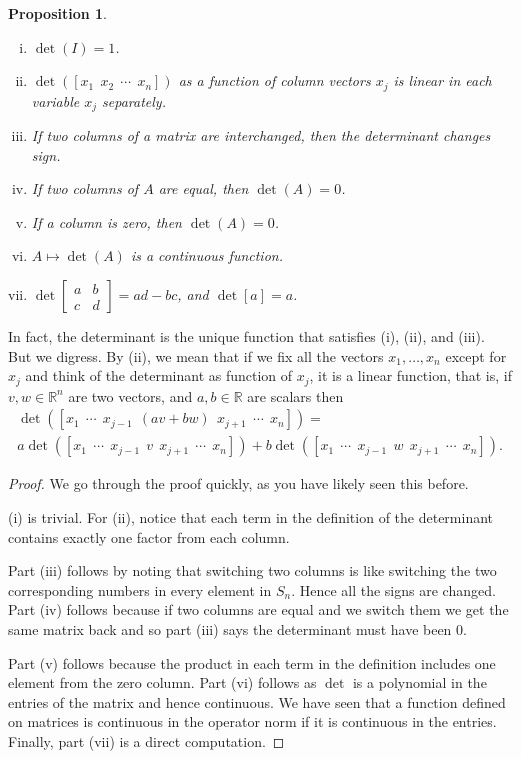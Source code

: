 \documentclass[12pt]{book}
\newcommand{\R}{{\mathbb{R}}}
\theoremstyle{plain}
\newtheorem{prop}[thm]{Proposition}
\theoremstyle{remark}
\theoremstyle{definition}
\theoremstyle{exercise}
\theoremstyle{example}
\begin{document}
\begin{prop}
{\ }
\begin{enumerate}[(i)]
\item $\det(I) = 1$.
\item $\det([x_1 ~~ x_2 ~~ \cdots ~~ x_n ])$ as a function of column vectors $x_j$
is linear in each variable $x_j$ separately.
\item If two columns of a matrix are interchanged, then the determinant changes
sign.
\item If two columns of $A$ are equal, then $\det(A) = 0$.
\item If a column is zero, then $\det(A) = 0$.
\item $A \mapsto \det(A)$ is a continuous function.
\item $\det\left[\begin{smallmatrix} a & b \\ c &d \end{smallmatrix}\right]
= ad-bc$, and $\det [a] = a$.
\end{enumerate}
\end{prop}

In fact, the determinant is the unique function that satisfies (i), (ii), and
(iii).
But we digress.  By (ii), we mean that if we fix all the vectors
$x_1,\ldots,x_n$ except for $x_j$ and think of the determinant as function
of $x_j$, it is a linear function, that is, if $v,w \in \R^n$ are two vectors,
and $a,b \in \R$ are scalars then
\begin{multline*}
\det([x_1 ~~ \cdots ~~ x_{j-1} ~~ (av+bw) ~~ x_{j+1} ~~ \cdots ~~ x_n]) =
\\
a \det([x_1 ~~ \cdots ~~ x_{j-1} ~~ v ~~ x_{j+1} ~~ \cdots ~~ x_n])
+
b
\det([x_1 ~~ \cdots ~~ x_{j-1} ~~ w ~~ x_{j+1} ~~ \cdots ~~ x_n]) .
\end{multline*}

\begin{proof}
We go through the proof quickly, as you have likely seen this before.

(i) is trivial.  For (ii), notice that each term in the definition of the
determinant contains exactly one factor from each column.

Part (iii) follows by noting that switching two columns is like switching the
two corresponding numbers in every element in $S_n$.  Hence all the signs
are changed.
Part (iv) follows because if two columns are equal and we switch them we get
the same matrix back and so part (iii) says the determinant must have been
0.

Part (v) follows because the product in each term in the definition includes
one element from the zero column.
Part (vi) follows as $\det$ is a polynomial in the entries of the matrix
and hence continuous.  We have seen that a function defined on
matrices is continuous in the operator norm if it is 
continuous in the entries.
Finally, part (vii) is a direct computation.
\end{proof}
\end{document}
